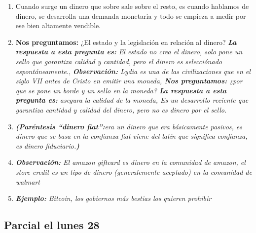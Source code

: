\begin{enumerate}
    \item Cuando surge un dinero que sobre sale sobre el resto, es cuando hablamos de dinero, se desarrolla una demanda monetaria y todo se empieza a medir por ese bien altamente vendible.
    \item \textbf{Nos preguntamos:} ¿El estado y la legislación en relación al dinero? \emph{\textbf{La respuesta a esta pregunta es: }El estado no crea el dinero, solo pone un sello que garantiza calidad y cantidad, pero el dinero es selecciónado espontáneamente.}, \emph{\textbf{Observación: }Lydia es una de las civilizaciones que en el siglo VII antes de Cristo en emitir una moneda, \textbf{Nos preguntamos:} ¿por que se pone un borde y un sello en la moneda? \emph{\textbf{La respuesta a esta pregunta es: }asegura la calidad de la moneda, Es un desarrollo reciente que garantiza cantidad y calidad del dinero, pero no es dinero por el sello.}}
    \item \emph{\textbf{(Paréntesis ``dinero fiat'':}era un dinero que era básicamente pasivos, es dinero que se basa en la confianza fiat viene del latín que significa confianza, es dinero fiduciario.\textbf{)}}
    \item \emph{\textbf{Observación: }El amazon giftcard es dinero en la comunidad de amazon, el store credit es un tipo de dinero (generalemente aceptado) en la comunidad de walmart}
    \item \emph{\textbf{Ejemplo: }Bitcoin, los gobiernos más bestias los quieren prohibir}
\end{enumerate}

\subsection{Parcial el lunes 28}


